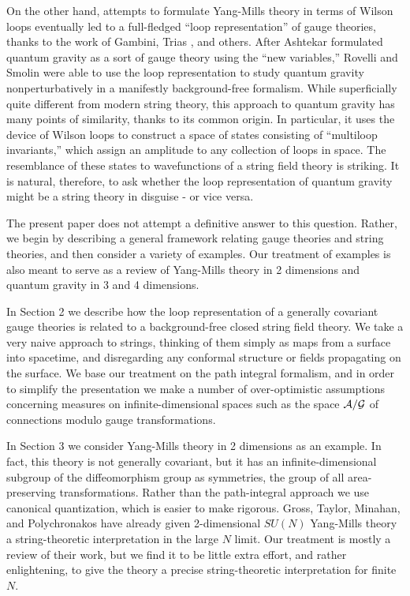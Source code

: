 \documentclass[12pt]{article}
\newcommand{\A}{{\cal A}}
\newcommand{\G}{{\cal G}}
\begin{document}
On the other hand, attempts to formulate Yang-Mills theory in terms of
Wilson loops eventually led to a full-fledged ``loop representation'' of
gauge theories, thanks to the work of Gambini, Trias \cite{GamTri}, and
others.   After Ashtekar \cite{A} formulated quantum gravity as a sort of gauge
theory using the ``new variables,''  Rovelli and Smolin \cite{RS}
were able to use
the loop representation to study quantum gravity nonperturbatively in a
manifestly background-free formalism.   While superficially
quite different from modern string theory, this approach to quantum gravity
has many points of similarity, thanks to its common origin.  In particular,
it uses the device of Wilson loops to construct a space of states
consisting of ``multiloop invariants,'' which assign an amplitude to any
collection of loops in space.  The resemblance of these states to
wavefunctions of a string field theory is striking.  It is natural,
therefore, to ask whether the loop representation of quantum gravity might
be a string theory in disguise - or vice versa.

The present paper does not attempt a definitive answer to this question.
Rather, we begin by describing a general framework relating gauge theories and
string theories, and then consider a variety of examples.  Our treatment of
examples is also meant to serve as a review of
Yang-Mills theory in 2 dimensions and quantum gravity in 3 and 4 dimensions.

In Section 2 we describe how the loop
representation of a generally covariant gauge theories is related to a
background-free closed string field theory. We take a very naive approach
to strings, thinking of them simply as maps from a surface into spacetime,
and disregarding any conformal structure or fields propagating on the
surface. We base our treatment on the path integral formalism, and in
order to simplify the presentation we make a number of over-optimistic
assumptions concerning measures on infinite-dimensional spaces such as the
space $\A/\G$ of connections modulo gauge transformations.

In Section 3 we consider Yang-Mills theory in 2 dimensions as an example.
In fact, this theory is not generally covariant, but it has an
infinite-dimensional subgroup of the diffeomorphism group as symmetries,
the group of all area-preserving transformations.   Rather than the
path-integral approach we use canonical quantization, which is easier to
make rigorous.   Gross, Taylor, Minahan, and Polychronakos
\cite{Gross,GT,Minahan,MP}  have already given 2-dimensional $SU(N)$
Yang-Mills theory a string-theoretic interpretation in the large $N$ limit.
Our treatment is mostly a review of their work, but we find it to be little
extra effort, and rather enlightening, to give the theory a precise
string-theoretic interpretation for finite $N$.
\end{document}
